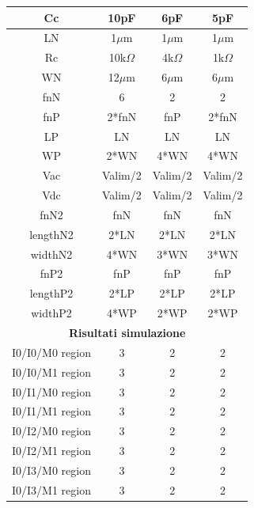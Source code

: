 \begin{longtable}{c|c|c|c|}
    \multicolumn{1}{|c|}{Cc} & 10pF & 6pF & 5pF \\ \hline
    \multicolumn{1}{|c|}{LN} & 1$\mu$m & 1$\mu$m & 1$\mu$m \\ \hline
    \multicolumn{1}{|c|}{Rc} & 10k$\Omega$ & 4k$\Omega$ & 1k$\Omega$ \\ \hline
    \multicolumn{1}{|c|}{WN} & 12$\mu$m & 6$\mu$m & 6$\mu$m \\ \hline
    \multicolumn{1}{|c|}{fnN} & 6 & 2 & 2 \\ \hline
    \multicolumn{1}{|c|}{fnP} & 2*fnN & fnP & 2*fnN \\ \hline
    \multicolumn{1}{|c|}{LP} & LN & LN & LN \\ \hline
    \multicolumn{1}{|c|}{WP} & 2*WN & 4*WN & 4*WN \\ \hline
    \multicolumn{1}{|c|}{Vac} & Valim/2 & Valim/2 & Valim/2 \\ \hline
    \multicolumn{1}{|c|}{Vdc} & Valim/2 & Valim/2 & Valim/2 \\ \hline
    \multicolumn{1}{|c|}{fnN2} & fnN & fnN & fnN \\ \hline
    \multicolumn{1}{|c|}{lengthN2} & 2*LN & 2*LN & 2*LN \\ \hline
    \multicolumn{1}{|c|}{widthN2} & 4*WN & 3*WN & 3*WN \\ \hline
    \multicolumn{1}{|c|}{fnP2} & fnP & fnP & fnP \\ \hline
    \multicolumn{1}{|c|}{lengthP2} & 2*LP & 2*LP & 2*LP \\ \hline
    \multicolumn{1}{|c|}{widthP2} & 4*WP & 2*WP & 2*WP \\ \hline
    \multicolumn{4}{|c|}{\textbf{Risultati simulazione}} \\ \hline
    \multicolumn{1}{|c|}{I0/I0/M0 region} & 3 & 2 & 2 \\ \hline
    \multicolumn{1}{|c|}{I0/I0/M1 region} & 3 & 2 & 2 \\ \hline
    \multicolumn{1}{|c|}{I0/I1/M0 region} & 3 & 2 & 2 \\ \hline
    \multicolumn{1}{|c|}{I0/I1/M1 region} & 3 & 2 & 2 \\ \hline
    \multicolumn{1}{|c|}{I0/I2/M0 region} & 3 & 2 & 2 \\ \hline
    \multicolumn{1}{|c|}{I0/I2/M1 region} & 3 & 2 & 2 \\ \hline
    \multicolumn{1}{|c|}{I0/I3/M0 region} & 3 & 2 & 2 \\ \hline
    \multicolumn{1}{|c|}{I0/I3/M1 region} & 3 & 2 & 2 \\ \hline

\end{longtable}
